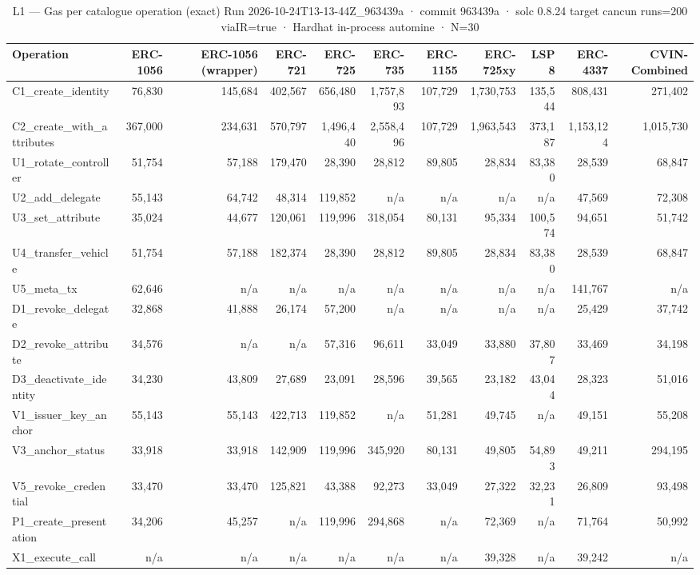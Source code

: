 \begin{table}[ht]
\centering
\small
\begin{tabular}{lrrrrrrrrrr}
\toprule
Operation & ERC-1056 & ERC-1056 (wrapper) & ERC-721 & ERC-725 & ERC-735 & ERC-1155 & ERC-725xy & LSP8 & ERC-4337 & CVIN-Combined \\
\midrule
C1\_create\_identity & 76,830 & 145,684 & 402,567 & 656,480 & 1,757,893 & 107,729 & 1,730,753 & 135,544 & 808,431 & 271,402 \\
C2\_create\_with\_attributes & 367,000 & 234,631 & 570,797 & 1,496,440 & 2,558,496 & 107,729 & 1,963,543 & 373,187 & 1,153,124 & 1,015,730 \\
U1\_rotate\_controller & 51,754 & 57,188 & 179,470 & 28,390 & 28,812 & 89,805 & 28,834 & 83,380 & 28,539 & 68,847 \\
U2\_add\_delegate & 55,143 & 64,742 & 48,314 & 119,852 & n/a & n/a & n/a & n/a & 47,569 & 72,308 \\
U3\_set\_attribute & 35,024 & 44,677 & 120,061 & 119,996 & 318,054 & 80,131 & 95,334 & 100,574 & 94,651 & 51,742 \\
U4\_transfer\_vehicle & 51,754 & 57,188 & 182,374 & 28,390 & 28,812 & 89,805 & 28,834 & 83,380 & 28,539 & 68,847 \\
U5\_meta\_tx & 62,646 & n/a & n/a & n/a & n/a & n/a & n/a & n/a & 141,767 & n/a \\
D1\_revoke\_delegate & 32,868 & 41,888 & 26,174 & 57,200 & n/a & n/a & n/a & n/a & 25,429 & 37,742 \\
D2\_revoke\_attribute & 34,576 & n/a & n/a & 57,316 & 96,611 & 33,049 & 33,880 & 37,807 & 33,469 & 34,198 \\
D3\_deactivate\_identity & 34,230 & 43,809 & 27,689 & 23,091 & 28,596 & 39,565 & 23,182 & 43,044 & 28,323 & 51,016 \\
V1\_issuer\_key\_anchor & 55,143 & 55,143 & 422,713 & 119,852 & n/a & 51,281 & 49,745 & n/a & 49,151 & 55,208 \\
V3\_anchor\_status & 33,918 & 33,918 & 142,909 & 119,996 & 345,920 & 80,131 & 49,805 & 54,893 & 49,211 & 294,195 \\
V5\_revoke\_credential & 33,470 & 33,470 & 125,821 & 43,388 & 92,273 & 33,049 & 27,322 & 32,231 & 26,809 & 93,498 \\
P1\_create\_presentation & 34,206 & 45,257 & n/a & 119,996 & 294,868 & n/a & 72,369 & n/a & 71,764 & 50,992 \\
X1\_execute\_call & n/a & n/a & n/a & n/a & n/a & n/a & 39,328 & n/a & 39,242 & n/a \\
\bottomrule
\end{tabular}
\caption{L1 — Gas per catalogue operation (exact) Run 2026-10-24T13-13-44Z\_963439a · commit 963439a · solc 0.8.24 target cancun runs=200 viaIR=true · Hardhat in-process automine · N=30}
\label{tab:crud_gas}
\end{table}
